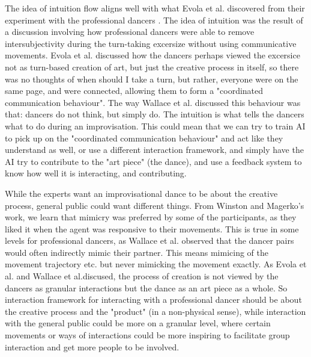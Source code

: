 \documentclass[final,5p,times,twocolumn,authoryear]{article}
\begin{document}
The idea of intuition flow aligns well with what Evola et al. discovered
from their experiment with the professional dancers \cite{Wallace2023,
Evola}. The idea of intuition was the result of a discussion involving
how professional dancers were able to remove intersubjectivity during
the turn-taking excersize without using communicative movements. Evola
et al. discussed how the dancers perhaps viewed the excersice not as
turn-based creation of art, but just the creative process in itself, so
there was no thoughts of when should I take a turn, but rather, everyone
were on the same page, and were connected, allowing them to form a
"coordinated communication behaviour". The way Wallace et al. discussed
this behaviour was that: dancers do not think, but simply do. The
intuition is what tells the dancers what to do during an improvisation.
This could mean that we can try to train AI to pick up on the
"coordinated communication behaviour" and act like they understand as
well, or use a different interaction framework, and simply have the AI
try to contribute to the "art piece" (the dance), and use a feedback
system to know how well it is interacting, and contributing.

While the experts want an improvisational dance to be about the creative
process, general public could want different things. From Winston and
Magerko's work, we learn that mimicry was preferred by some of the
participants, as they liked it when the agent was responsive to their
movements. This is true in some levels for professional dancers, as
Wallace et al. observed that the dancer pairs would often indirectly
mimic their partner. This means mimicing of the movement trajectory etc.
but never mimicking the movement exactly. As Evola et al. and Wallace et
al.discused, the process of creation is not viewed by the dancers as
granular interactions but the dance as an art piece as a whole. So
interaction framework for interacting with a professional dancer should
be about the creative process and the "product" (in a non-physical
sense), while interaction with the general public could be more on a
granular level, where certain movements or ways of interactions could be more
inspiring to facilitate group interaction and get more people to be involved.
 
\end{document}
